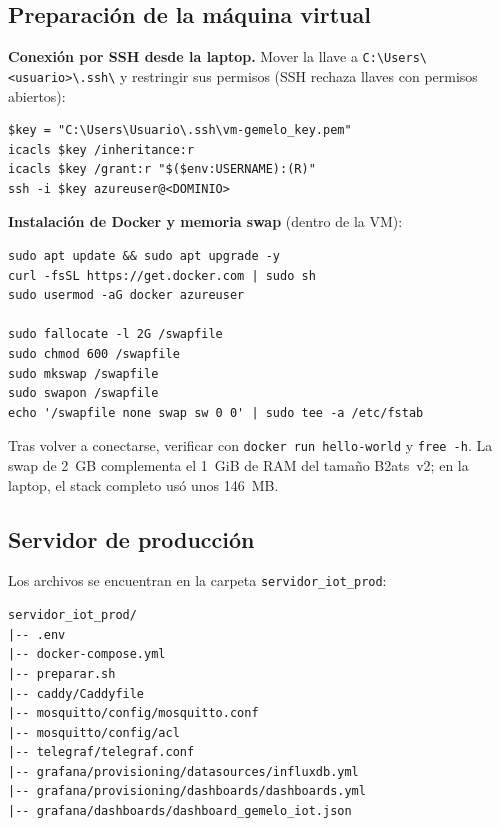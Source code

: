 \documentclass[11pt,a4paper]{article}
\newcommand{\arch}[1]{\texttt{#1}}
\begin{document}
\subsection{Preparaci\'on de la m\'aquina virtual}

\textbf{Conexi\'on por SSH desde la laptop.} Mover la llave a
\arch{C:\textbackslash Users\textbackslash <usuario>\textbackslash .ssh\textbackslash} y
restringir sus permisos (SSH rechaza llaves con permisos abiertos):
\begin{lstlisting}[style=bash]
$key = "C:\Users\Usuario\.ssh\vm-gemelo_key.pem"
icacls $key /inheritance:r
icacls $key /grant:r "$($env:USERNAME):(R)"
ssh -i $key azureuser@<DOMINIO>
\end{lstlisting}

\textbf{Instalaci\'on de Docker y memoria swap} (dentro de la VM):
\begin{lstlisting}[style=bash]
sudo apt update && sudo apt upgrade -y
curl -fsSL https://get.docker.com | sudo sh
sudo usermod -aG docker azureuser

sudo fallocate -l 2G /swapfile
sudo chmod 600 /swapfile
sudo mkswap /swapfile
sudo swapon /swapfile
echo '/swapfile none swap sw 0 0' | sudo tee -a /etc/fstab
\end{lstlisting}
Tras volver a conectarse, verificar con \texttt{docker run hello-world} y \texttt{free -h}.
La swap de 2~GB complementa el 1~GiB de RAM del tama\~no B2ats~v2; en la laptop, el stack
completo us\'o unos 146~MB.

\subsection{Servidor de producci\'on}

Los archivos se encuentran en la carpeta \arch{servidor\_iot\_prod}:

\begin{lstlisting}[style=plano]
servidor_iot_prod/
|-- .env
|-- docker-compose.yml
|-- preparar.sh
|-- caddy/Caddyfile
|-- mosquitto/config/mosquitto.conf
|-- mosquitto/config/acl
|-- telegraf/telegraf.conf
|-- grafana/provisioning/datasources/influxdb.yml
|-- grafana/provisioning/dashboards/dashboards.yml
|-- grafana/dashboards/dashboard_gemelo_iot.json
\end{lstlisting}
\end{document}
